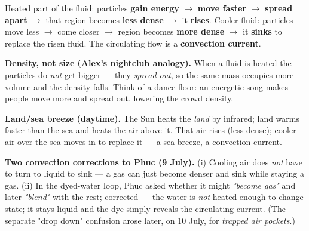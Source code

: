 \documentclass[11pt,a4paper]{article}
\begin{document}
\begin{keybox}
Heated part of the fluid: particles \textbf{gain energy} $\to$ \textbf{move faster} $\to$
\textbf{spread apart} $\to$ that region becomes \textbf{less dense} $\to$ it \textbf{rises}.
Cooler fluid: particles move less $\to$ come closer $\to$ region becomes \textbf{more
dense} $\to$ it \textbf{sinks} to replace the risen fluid. The circulating flow is a
\textbf{convection current}.
\end{keybox}

\begin{center}
\end{center}

\begin{watchbox}
\textbf{Density, not size (Alex's nightclub analogy).} When a fluid is heated the particles
do \emph{not} get bigger --- they \emph{spread out}, so the same mass occupies more volume
and the density falls. Think of a dance floor: an energetic song makes people move more and
spread out, lowering the crowd density.
\end{watchbox}

\textbf{Land/sea breeze (daytime).} The Sun heats the \emph{land} by infrared; land warms
faster than the sea and heats the air above it. That air rises (less dense); cooler air
over the sea moves in to replace it --- a sea breeze, a convection current.

\begin{watchbox}
\textbf{Two convection corrections to Phuc (9 July).} (i) Cooling air does \emph{not} have to
turn to liquid to sink --- a gas can just become denser and sink while staying a gas. (ii)
In the dyed-water loop, Phuc asked whether it might \emph{"become gas"} and later
\emph{"blend"} with the rest; corrected --- the water is \emph{not} heated enough to change
state; it stays liquid and the dye simply reveals the circulating current. (The separate
"drop down" confusion arose later, on 10 July, for \emph{trapped air pockets}.)
\end{watchbox}
\end{document}
